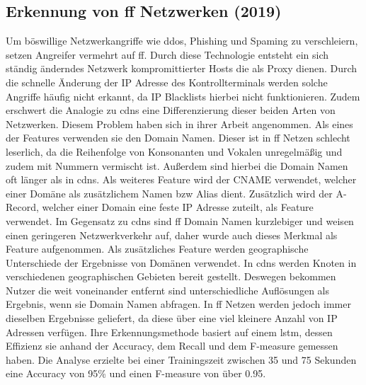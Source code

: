 \documentclass[
    12pt, %
    DIV10,
    ngerman, %
    a4paper, %
    oneside, %
    titlepage, %
    parskip=half, %
    headings=normal, %
    listof=totoc, %
    bibliography=totoc, %
    index=totoc, %
    captions=tableheading, %
    final %
]{scrreprt}
\begin{document}
\subsection{Erkennung von \acs{ff} Netzwerken (2019)}
Um böswillige Netzwerkangriffe wie \ac{ddos}, Phishing und Spaming zu verschleiern, setzen Angreifer vermehrt auf \ac{ff}. Durch diese Technologie entsteht ein sich ständig änderndes Netzwerk kompromittierter Hosts die als Proxy dienen. Durch die schnelle Änderung der IP Adresse des Kontrollterminals werden solche Angriffe häufig nicht erkannt, da IP Blacklists hierbei nicht funktionieren. Zudem erschwert die Analogie zu \ac{cdns} eine Differenzierung dieser beiden Arten von Netzwerken.
Diesem Problem haben sich \textcite{Chen2019} in ihrer Arbeit angenommen. Als eines der Features verwenden sie den Domain Namen. Dieser ist in \ac{ff} Netzen schlecht leserlich, da die Reihenfolge von Konsonanten und Vokalen unregelmä{\ss}ig und zudem mit Nummern vermischt ist. Au{\ss}erdem sind hierbei die Domain Namen oft länger als in \ac{cdns}. Als weiteres Feature wird der CNAME verwendet, welcher einer Domäne als zusätzlichem Namen bzw Alias dient. Zusätzlich wird der A-Record, welcher einer Domain eine feste IP Adresse zuteilt, als Feature verwendet. Im Gegensatz zu \ac{cdns} sind \ac{ff} Domain Namen kurzlebiger und weisen einen geringeren Netzwerkverkehr auf, daher wurde auch dieses Merkmal als Feature aufgenommen. Als zusätzliches Feature werden geographische Unterschiede der Ergebnisse von Domänen verwendet. In \ac{cdns} werden Knoten in verschiedenen geographischen Gebieten bereit gestellt. Deswegen bekommen Nutzer die weit voneinander entfernt sind unterschiedliche Auflösungen als Ergebnis, wenn sie Domain Namen abfragen. In \ac{ff} Netzen werden jedoch immer dieselben Ergebnisse geliefert, da diese über eine viel kleinere Anzahl von IP Adressen verfügen. Ihre Erkennungsmethode basiert auf einem \ac{lstm}, dessen Effizienz sie anhand der Accuracy, dem Recall und dem F-measure gemessen haben. Die Analyse erzielte bei einer Trainingszeit zwischen 35 und 75 Sekunden eine Accuracy von 95\% und einen F-measure von über 0.95.
%
\end{document}
